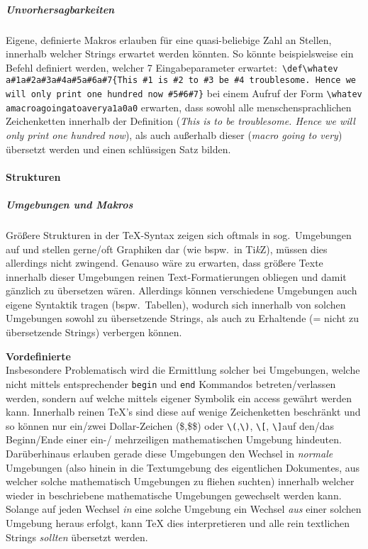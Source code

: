 \subparagraph*{Unvorhersagbarkeiten}%
Eigene, definierte Makros erlauben für eine quasi-beliebige Zahl an Stellen, innerhalb welcher Strings erwartet werden könnten. So könnte beispielsweise ein Befehl definiert werden, welcher 7 Eingabeparameter erwartet:\ \verb|\def\whatev a#1a#2a#3a#4a#5a#6a#7{This #1 is #2 to #3 be #4 troublesome. Hence we will only print one hundred now #5#6#7}| bei einem Aufruf der Form \verb|\whatev amacroagoingatoaverya1a0a0| erwarten, dass sowohl alle menschensprachlichen Zeichenketten innerhalb der Definition (\textit{This is to be troublesome. Hence we will only print one hundred now}), als auch außerhalb dieser (\textit{macro going to very}) übersetzt werden und einen schlüssigen Satz bilden.

\paragraph*{Strukturen}
\subparagraph*{Umgebungen und Makros}
Größere Strukturen in der \TeX{}-Syntax zeigen sich oftmals in sog.\ Umgebungen auf und stellen gerne/oft Graphiken dar (wie bspw.\ in Ti\textit{k}Z), müssen dies allerdings nicht zwingend. Genauso wäre zu erwarten, dass größere Texte innerhalb dieser Umgebungen reinen Text-Formatierungen obliegen und damit gänzlich zu übersetzen wären. Allerdings können verschiedene Umgebungen auch eigene Syntaktik tragen (bspw.\ Tabellen), wodurch sich innerhalb von solchen Umgebungen sowohl zu übersetzende Strings, als auch zu Erhaltende (= nicht zu übersetzende Strings) verbergen können. 

\textbf{Vordefinierte}\\
\noindent Insbesondere Problematisch wird die Ermittlung solcher bei Umgebungen, welche nicht mittels entsprechender \texttt{begin} und \texttt{end} Kommandos betreten/verlassen werden, sondern auf welche mittels eigener Symbolik ein access gewährt werden kann. Innerhalb reinen \TeX{}'s sind diese auf wenige Zeichenketten beschränkt und so können nur ein/zwei Dollar-Zeichen (\$,\$\$) oder \verb|\(|,\verb|\)|, \verb|\[|, \verb|\]|auf den/das Beginn/Ende einer ein-/ mehrzeiligen mathematischen Umgebung hindeuten. Darüberhinaus erlauben gerade diese Umgebungen den Wechsel in \textit{normale} Umgebungen (also hinein in die Textumgebung des eigentlichen Dokumentes, aus welcher solche mathematisch Umgebungen zu fliehen suchten) innerhalb welcher wieder in beschriebene mathematische Umgebungen gewechselt werden kann. Solange auf jeden Wechsel \textit{in} eine solche Umgebung ein Wechsel \textit{aus} einer solchen Umgebung heraus erfolgt, kann \TeX{} dies interpretieren und alle rein textlichen Strings \textit{sollten} übersetzt werden.

